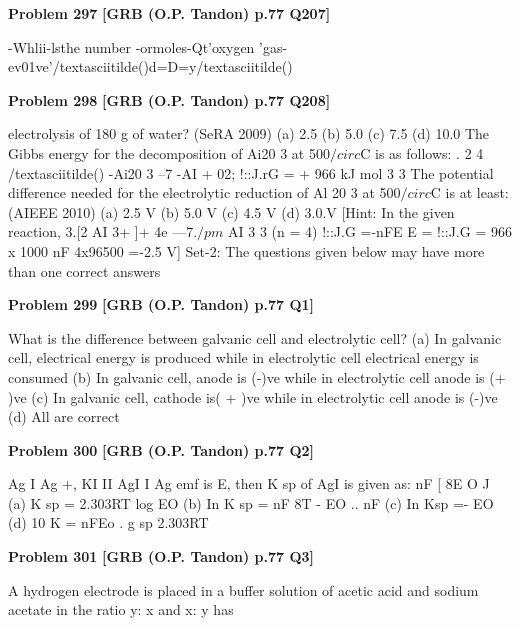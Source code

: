 \begin{problembox}
\textbf{Problem 297} \hfill \textbf{[GRB (O.P. Tandon) p.77 Q207]}
\label{q:ext-grb_all_questions-297}

-Whlii-lsthe number -ormoles-Qt'oxygen 'gas-ev01ve'/textasciitilde()d=D=y/textasciitilde()
\end{problembox}

\begin{problembox}
\textbf{Problem 298} \hfill \textbf{[GRB (O.P. Tandon) p.77 Q208]}
\label{q:ext-grb_all_questions-298}

electrolysis of 180 g of water? 
(SeRA 2009) 
(a) 2.5 
(b) 5.0 
(c) 7.5 
(d) 10.0 
The Gibbs energy for the decomposition of Ai20 3 at 500$/circ$C is 
as follows: 
. 
2 
4 
/textasciitilde() 
-Ai20 3 --7 -AI + 02; !::J.rG = + 966 kJ mol 
3 
3 
The potential difference needed for the electrolytic reduction 
of Al 20 3 at 500$/circ$C is at least: 
(AIEEE 2010) 
(a) 2.5 V 
(b) 5.0 V 
(c) 4.5 V 
(d) 3.0.V 
[Hint: In the given reaction, 
3.[2 AI 3+ ]+ 4e ---7.$/pm$ AI 
3 
3 
(n = 4) 
!::J.G =-nFE 
E = \underline{\hspace{1cm}} !::J.G = 966 x 1000 
nF 
4x96500 
=-2.5 V] 
Set-2: The questions given below may have more 
than one correct answers
\end{problembox}

\begin{problembox}
\textbf{Problem 299} \hfill \textbf{[GRB (O.P. Tandon) p.77 Q1]}
\label{q:ext-grb_all_questions-299}

What is the difference between galvanic cell and electrolytic 
cell? 
(a) In galvanic cell, electrical energy is produced while in 
electrolytic cell electrical energy is consumed 
(b) In galvanic cell, anode is (-)ve while in electrolytic cell 
anode is (+ )ve 
(c) In galvanic cell, cathode is( + )ve while in electrolytic cell 
anode is (-)ve 
(d) All are correct
\end{problembox}

\begin{problembox}
\textbf{Problem 300} \hfill \textbf{[GRB (O.P. Tandon) p.77 Q2]}
\label{q:ext-grb_all_questions-300}

Ag I Ag +, KI II AgI I Ag emf is E, then K sp of AgI is given as: 
nF 
[ 8E
O 
J 
(a) K sp = 2.303RT log EO 
(b) In K sp = nF 
8T - EO .. 
nF 
(c) In Ksp =-
EO 
(d) 10 K 
= 
nFEo . 
g 
sp 
2.303RT
\end{problembox}

\begin{problembox}
\textbf{Problem 301} \hfill \textbf{[GRB (O.P. Tandon) p.77 Q3]}
\label{q:ext-grb_all_questions-301}

A hydrogen electrode is placed in a buffer solution of acetic 
acid and sodium acetate in the ratio y: x and x: y has
\end{problembox}

